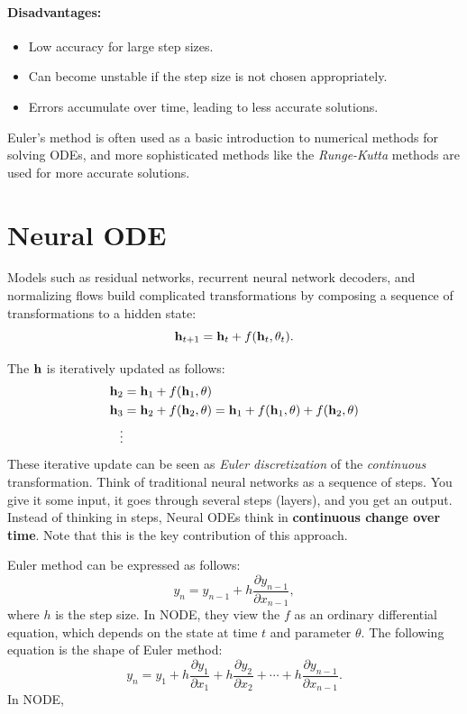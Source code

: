 \paragraph{Disadvantages:}
\begin{itemize}
	\item Low accuracy for large step sizes.
	\item Can become unstable if the step size is not chosen appropriately.
	\item Errors accumulate over time, leading to less accurate solutions.
\end{itemize}

Euler's method is often used as a basic introduction to numerical methods for solving ODEs, and more sophisticated methods like the \textit{Runge-Kutta} methods are used for more accurate solutions.



\section{Neural ODE}


Models such as residual networks, recurrent neural network decoders, and normalizing flows build complicated transformations by composing a sequence of transformations to a hidden state:
$${\mathbf{h}}_{t+1} = {\mathbf{h}}_{t}+f({\mathbf{h}}_{t}, \theta_t).$$

The ${\mathbf{h}}$ is iteratively updated as follows:
\begin{align*}
	{\mathbf{h}}_{2} &= {\mathbf{h}}_{1}+f({\mathbf{h}}_{1}, \theta)\\
	{\mathbf{h}}_{3} &= {\mathbf{h}}_{2}+f({\mathbf{h}}_{2}, \theta) = {\mathbf{h}}_{1}+f({\mathbf{h}}_{1}, \theta)+f({\mathbf{h}}_{2}, \theta)\\
	\vdots
\end{align*}
These iterative update can be seen as \textit{Euler discretization} of the \textit{continuous} transformation. Think of traditional neural networks as a sequence of steps. You give it some input, it goes through several steps (layers), and you get an output. Instead of thinking in steps, Neural ODEs think in \textbf{continuous change over time}. Note that this is the key contribution of this approach.   

Euler method can be expressed as follows: 
$$y_n = y_{n-1}+h\frac{\partial y_{n-1}}{\partial x_{n-1}},$$
where $h$ is the step size. In NODE, they view the $f$ as an ordinary differential equation, which depends on the state at time $t$ and parameter $\theta$. The following equation is the shape of Euler method:
$$y_n = y_{1}+h\frac{\partial y_{1}}{\partial x_{1}}+h\frac{\partial y_{2}}{\partial x_{2}}+\cdots+h\frac{\partial y_{n-1}}{\partial x_{n-1}}.$$
In NODE, 



